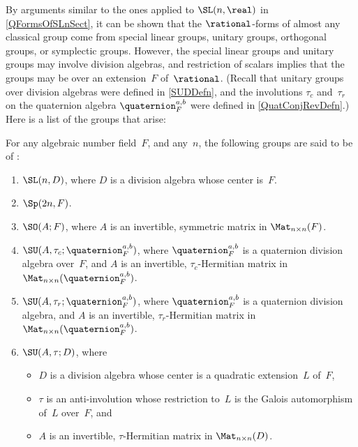 By arguments similar to the ones applied to $\SL(n,\real)$ in \cref{QFormsOfSLnSect}, it can be shown that the $\rational$-forms of almost any classical group come from special linear groups, unitary groups, orthogonal groups, or symplectic groups. However, the special linear groups and unitary groups may involve division algebras, and restriction of scalars  implies that the groups may be over an extension~$F$ of~$\rational$. 
(Recall that unitary groups over division algebras were defined in \cref{SUDDefn}, and the involutions $\tau_c$ and~$\tau_r$ on the quaternion algebra $\quaternion_F^{a,b}$ were defined in \cref{QuatConjRevDefn}.)
Here is a list of the groups that arise:

\begin{defn} \label{FClassicalDefn}
For any algebraic number field~$F$, and any~$n$, the following groups are said to be of :
	 \begin{enumerate}

	 \item \label{FClassicalDefn-SL}
	 $\SL(n,D)$, where $D$ is a division algebra whose center is~$F$.

	 \item \label{FClassicalDefn-Sp}
	 $\Sp(2n,F)$.

	 \item \label{FClassicalDefn-SO}
	 $\SO(A;F)$, where $A$ is an invertible, symmetric matrix 
	 in $\Mat_{n \times n}(F)$.

	 \item \label{FClassicalDefn-SUSp}
	 $\SU(A, \tau_c; \quaternion_F^{a,b})$, where $\quaternion_F^{a,b}$ is a quaternion division algebra over~$F$, and $A$ is an invertible, $\tau_c$-Hermitian matrix in  $\Mat_{n \times n}(\quaternion_F^{a,b})$.

	 \item \label{FClassicalDefn-SUSO}
	 $\SU(A, \tau_r; \quaternion_F^{a,b})$, where $\quaternion_F^{a,b}$ is a quaternion division algebra, and $A$ is an invertible, $\tau_r$-Hermitian matrix in  $\Mat_{n \times n}(\quaternion_F^{a,b})$.

	 \item \label{FClassicalDefn-SUSL}
	 $\SU(A,\tau;D)$, where 
	 	\begin{itemize}
		\item $D$ is a division algebra whose center is a quadratic extension~$L$ of~$F$, 
		\item $\tau$ is an anti-involution whose restriction to~$L$ is the Galois automorphism of~$L$ over~$F$, 
		and 
		\item $A$ is an invertible, $\tau$-Hermitian matrix in  $\Mat_{n \times n}(D)$.
		\end{itemize}
	 \end{enumerate}
\end{defn}

